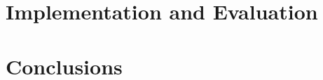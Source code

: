 \documentclass[a4paper,11pt,twoside,onecolumn,final,openright]{book}
\begin{document}

\part{Implementation and Evaluation}
\thispagestyle{empty}


                 

\part{Conclusions}
                 

%








\begin{singlespace}

\def\indexname{Index}             %
\printindex\cleardoublepage

\end{singlespace}
\end{document}
